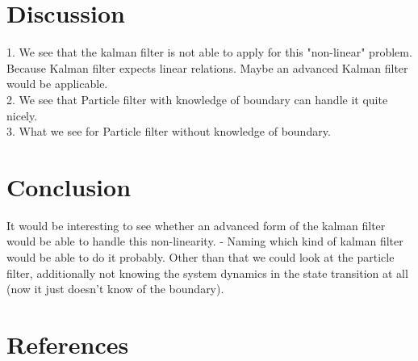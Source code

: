 \documentclass[conference]{IEEEtran}
\begin{document}

\section{Discussion}


1. We see that the kalman filter is not able to apply for this "non-linear" problem. Because Kalman filter expects linear relations. Maybe an advanced Kalman filter would be applicable. \\
2. We see that Particle filter with knowledge of boundary can handle it quite nicely.  \\
3. What we see for Particle filter without knowledge of boundary. \\

\section{Conclusion}

It would be interesting to see whether an advanced form of the kalman filter would be able to handle this non-linearity. 
- Naming which kind of kalman filter would be able to do it probably.
Other than that we could look at the particle filter, additionally not knowing the system dynamics in the state transition at all (now it just doesn't know of the boundary).




\section*{References}
\end{document}
